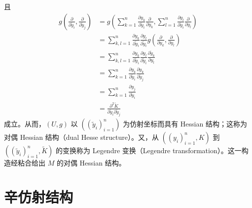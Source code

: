 
且
\begin{align}
  g\left(\frac{\partial}{\partial \tilde y_i}, \frac{\partial}{\partial \tilde y_j}\right)
  &= g\left(\sum_{k=1}^{n}\frac{\partial y_k}{\partial \tilde y_i}\frac{\partial}{\partial y_k},
    \sum_{l=1}^{n}\frac{\partial y_l}{\partial \tilde y_i}\frac{\partial}{\partial y_l}\right) \tag{24.8}\\
  &= \sum_{k,l=1}^{n}\frac{\partial y_k}{\partial \tilde y_i}\frac{\partial y_l}{\partial \tilde y_i}
    g\left(\frac{\partial}{\partial y_k}, \frac{\partial}{\partial y_l}\right) \tag{24.9}\\
  &= \sum_{k,l=1}^{n}\frac{\partial y_k}{\partial \tilde y_i}\frac{\partial y_l}{\partial \tilde y_i}
    \frac{\partial \tilde y_k}{\partial y_l} \tag{24.10}\\
  &= \sum_{k=1}^{n}\frac{\partial y_k}{\partial \tilde y_i}\frac{\partial y_k}{\partial \tilde y_j} \tag{24.11}\\
  &= \sum_{k=1}^{n}\frac{\partial y_j}{\partial \tilde y_i} \tag{24.12}\\
  &= \frac{\partial^2 \tilde K}{\partial \tilde y_i\partial \tilde y_j} \tag{24.13}
\end{align}
成立。从而，$(U,g)$ 以 $((\tilde y_i)_{i=1}^{n})$ 为仿射坐标而具有 Hessian 结构；这称为对偶 Hessian 结构（dual Hesse structure）。又，从 $((y_i)_{i=1}^{n},K)$ 到 $((\tilde y_i)_{i=1}^{n},\tilde K)$ 的变换称为 Legendre 变换（Legendre transformation）。这一构造经粘合给出 $M$ 的对偶 Hessian 结构。


\section{辛仿射结构}

